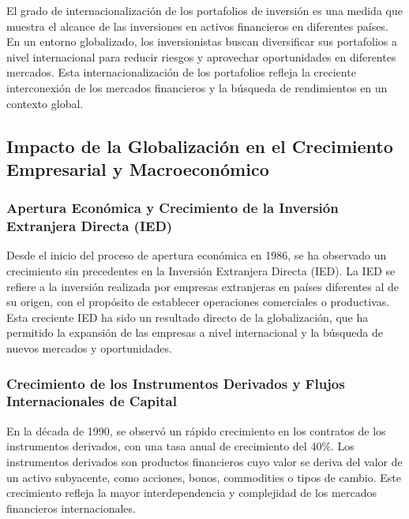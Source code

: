 \documentclass[
  a4paper,
]{article}
\begin{document}
El grado de internacionalización de los portafolios de inversión es una
medida que muestra el alcance de las inversiones en activos financieros
en diferentes países. En un entorno globalizado, los inversionistas
buscan diversificar sus portafolios a nivel internacional para reducir
riesgos y aprovechar oportunidades en diferentes mercados. Esta
internacionalización de los portafolios refleja la creciente
interconexión de los mercados financieros y la búsqueda de rendimientos
en un contexto global.

\hypertarget{impacto-de-la-globalizaciuxf3n-en-el-crecimiento-empresarial-y-macroeconuxf3mico}{%
\subsection{Impacto de la Globalización en el Crecimiento Empresarial y
Macroeconómico}\label{impacto-de-la-globalizaciuxf3n-en-el-crecimiento-empresarial-y-macroeconuxf3mico}}

\hypertarget{apertura-econuxf3mica-y-crecimiento-de-la-inversiuxf3n-extranjera-directa-ied}{%
\subsubsection{Apertura Económica y Crecimiento de la Inversión
Extranjera Directa
(IED)}\label{apertura-econuxf3mica-y-crecimiento-de-la-inversiuxf3n-extranjera-directa-ied}}

Desde el inicio del proceso de apertura económica en 1986, se ha
observado un crecimiento sin precedentes en la Inversión Extranjera
Directa (IED). La IED se refiere a la inversión realizada por empresas
extranjeras en países diferentes al de su origen, con el propósito de
establecer operaciones comerciales o productivas. Esta creciente IED ha
sido un resultado directo de la globalización, que ha permitido la
expansión de las empresas a nivel internacional y la búsqueda de nuevos
mercados y oportunidades.

\hypertarget{crecimiento-de-los-instrumentos-derivados-y-flujos-internacionales-de-capital}{%
\subsubsection{Crecimiento de los Instrumentos Derivados y Flujos
Internacionales de
Capital}\label{crecimiento-de-los-instrumentos-derivados-y-flujos-internacionales-de-capital}}

En la década de 1990, se observó un rápido crecimiento en los contratos
de los instrumentos derivados, con una tasa anual de crecimiento del
40\%. Los instrumentos derivados son productos financieros cuyo valor se
deriva del valor de un activo subyacente, como acciones, bonos,
commodities o tipos de cambio. Este crecimiento refleja la mayor
interdependencia y complejidad de los mercados financieros
internacionales.
\end{document}
